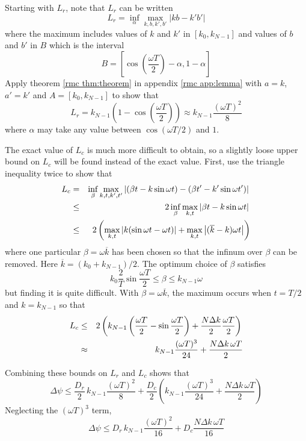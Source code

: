 Starting with $L_r$, note that $L_r$ can be written 
\begin{equation}
L_r=\inf_{\alpha}\max_{k,b,k',b'} \left|kb-k'b'\right|
\end{equation}
where the maximum includes values of $k$ and $k'$ in $[k_0,k_{N-1}]$ and 
values of $b$ and $b'$ in $B$ which is the interval
\begin{equation}
B=\left[\cos\left(\frac{\omega T}{2}\right)-\alpha,1-\alpha\right]
\end{equation}
Apply theorem \ref{rmc thm:theorem} in appendix \ref{rmc app:lemma}
with $a=k$, $a'=k'$ and $A=[k_0,k_{N-1}]$ to show that
\begin{equation}
L_r=k_{N-1}\left(1-\cos\left(\frac{\omega T}{2}\right)\right)
\approx k_{N-1}\frac{(\omega T)^2}{8}
\end{equation}
where $\alpha$ may take any value between $\cos(\omega T/2)$ and $1$.

The exact value of $L_c$ is much more difficult to obtain, so a slightly
loose upper bound on $L_c$ will be found instead of the exact value.
First, use the triangle inequality twice to show that
\begin{eqnarray}
L_c&=&\inf_{\beta}\max_{k,t,k',t'} \left|\left(\beta t-k\sin\omega t\right)-
\left(\beta t'-k'\sin\omega t'\right)\right| {\nonumber}\\
&\leq&2\inf_{\beta}\max_{k,t} \left|\beta t-k\sin\omega t\right| {\nonumber}\\
&\leq&2\left(
\max_{k,t}\left|k(\sin\omega t-\omega t)\right|+
\max_{k,t} \left|(\overline{k}-k)\omega t\right|
\right)
\end{eqnarray}
where one particular $\beta=\omega\overline{k}$ has been chosen so that the
infinum over $\beta$ can be removed.  Here $\overline{k}=(k_0+k_{N-1})/2$.
The optimum choice of $\beta$ satisfies
\begin{equation}
k_0\frac{2}{T}\sin\frac{\omega T}{2}\leq \beta \leq k_{N-1}\omega
\end{equation}
but finding it is quite difficult.  With $\beta=\omega\overline{k}$, 
the maximum occurs when $t=T/2$ and $k=k_{N-1}$ so that
\begin{eqnarray}
L_c&\leq&2\left(k_{N-1}\left(\frac{\omega T}{2}-\sin\frac{\omega T}{2}\right)
+\frac{N\Delta k}{2}\frac{\omega T}{2}\right){\nonumber}\\
&\approx&k_{N-1}\frac{(\omega T)^3}{24}+\frac{N\Delta k\,\omega T}{2}
\end{eqnarray}

Combining these bounds on $L_r$ and $L_c$ shows that
\begin{equation}
\Delta\psi
\leq\frac{D_r}{2}\,k_{N-1}\frac{(\omega T)^2}{8}
+\frac{D_c}{2}\left(k_{N-1}\frac{(\omega T)^3}{24}
+\frac{N\Delta k\,\omega T}{2}\right)			
\end{equation}
Neglecting the $(\omega T)^3$ term, 
\begin{equation}
\Delta\psi\leq
D_r\,k_{N-1}\frac{(\omega T)^2}{16}
+D_c\frac{N\Delta k\,\omega T}{16}
\end{equation}

